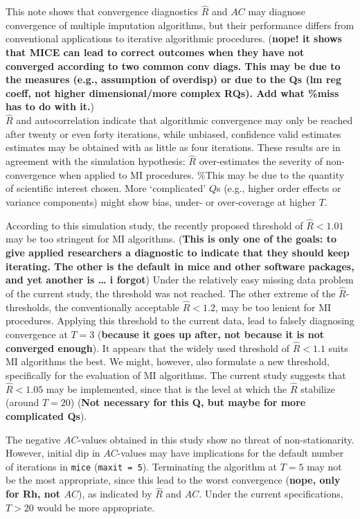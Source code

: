 \documentclass[Royal,times,sageh]{sagej}
\begin{document}
This note shows that convergence diagnostics \(\widehat{R}\) and \(AC\)
may diagnose convergence of multiple imputation algorithms, but their
performance differs from conventional applications to iterative
algorithmic procedures. (\textbf{nope! it shows that MICE can lead to
correct outcomes when they have not converged according to two common
conv diags. This may be due to the measures (e.g., assumption of
overdisp) or due to the Qs (lm reg coeff, not higher dimensional/more
complex RQs). Add what \%miss has to do with it.})\\
\(\widehat{R}\) and autocorrelation indicate that algorithmic
convergence may only be reached after twenty or even forty iterations,
while unbiased, confidence valid estimates estimates may be obtained
with as little as four iterations. These results are in agreement with
the simulation hypothesis: \(\widehat{R}\) over-estimates the severity
of non-convergence when applied to MI procedures. \%This may be due to
the quantity of scientific interest chosen. More `complicated' \(Q\)s
(e.g., higher order effects or variance components) might show bias,
under- or over-coverage at higher \(T\).

According to this simulation study, the recently proposed threshold of
\(\widehat{R}<1.01\) may be too stringent for MI algorithms.
(\textbf{This is only one of the goals: to give applied researchers a
diagnostic to indicate that they should keep iterating. The other is the
default in mice and other software packages, and yet another is \ldots{}
i forgot}) Under the relatively easy missing data problem of the current
study, the threshold was not reached. The other extreme of the
\(\widehat{R}\)-thresholds, the conventionally acceptable
\(\widehat{R} <1.2\), may be too lenient for MI procedures. Applying
this threshold to the current data, lead to falsely diagnosing
convergence at \(T = 3\) (\textbf{because it goes up after, not because
it is not converged enough}). It appears that the widely used threshold
of \(\widehat{R} < 1.1\) suits MI algorithms the best. We might,
however, also formulate a new threshold, specifically for the evaluation
of MI algorithms. The current study suggests that \(\widehat{R} < 1.05\)
may be implemented, since that is the level at which the \(\widehat{R}\)
stabilize (around \(T = 20\)) (\textbf{Not necessary for this Q, but
maybe for more complicated Qs}).

The negative \(AC\)-values obtained in this study show no threat of
non-stationarity. However, initial dip in \(AC\)-values may have
implications for the default number of iterations in \texttt{mice}
(\texttt{maxit\ =\ 5}). Terminating the algorithm at \(T=5\) may not be
the most appropriate, since this lead to the worst convergence
(\textbf{nope, only for Rh, not \(AC\)}), as indicated by
\(\widehat{R}\) and \(AC\). Under the current specifications, \(T>20\)
would be more appropriate.
\end{document}
